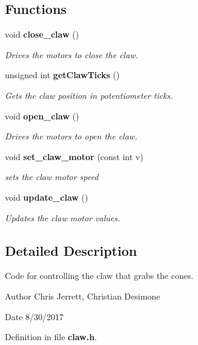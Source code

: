 \subsection*{Functions}
\begin{DoxyCompactItemize}
\item 
void \textbf{ close\+\_\+claw} ()
\begin{DoxyCompactList}\small\item\em Drives the motors to close the claw. \end{DoxyCompactList}\item 
unsigned int \textbf{ get\+Claw\+Ticks} ()
\begin{DoxyCompactList}\small\item\em Gets the claw position in potentiometer ticks. \end{DoxyCompactList}\item 
void \textbf{ open\+\_\+claw} ()
\begin{DoxyCompactList}\small\item\em Drives the motors to open the claw. \end{DoxyCompactList}\item 
void \textbf{ set\+\_\+claw\+\_\+motor} (const int v)
\begin{DoxyCompactList}\small\item\em sets the claw motor speed \end{DoxyCompactList}\item 
void \textbf{ update\+\_\+claw} ()
\begin{DoxyCompactList}\small\item\em Updates the claw motor values. \end{DoxyCompactList}\end{DoxyCompactItemize}


\subsection{Detailed Description}
Code for controlling the claw that grabs the cones. 

\begin{DoxyAuthor}{Author}
Chris Jerrett, Christian Desimone 
\end{DoxyAuthor}
\begin{DoxyDate}{Date}
8/30/2017 
\end{DoxyDate}


Definition in file \textbf{ claw.\+h}.



